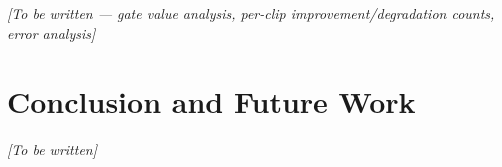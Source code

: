 \documentclass{article} %
\begin{document}
%
%
%
%
\textit{[To be written --- gate value analysis, per-clip improvement/degradation counts, error analysis]}

\section{Conclusion and Future Work}
\label{sec:conclusion}

\textit{[To be written]}



\end{document}
